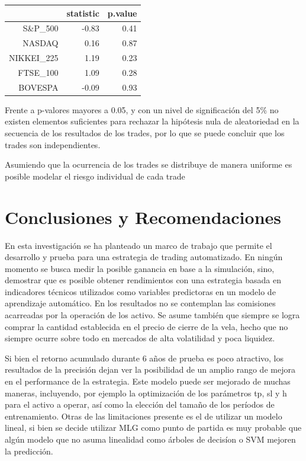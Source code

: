 \documentclass[a4paper,12pt]{Latex/Classes/PhDthesisPSnPDF}
\begin{document}
 
\begin{center}
\begin{table}[ht]
\centering
\begin{tabular}{rrr}
  \hline
 & statistic & p.value \\ 
  \hline
S\&P\_500 & -0.83 & 0.41 \\ 
  NASDAQ & 0.16 & 0.87 \\ 
  NIKKEI\_225 & 1.19 & 0.23 \\ 
  FTSE\_100 & 1.09 & 0.28 \\ 
  BOVESPA & -0.09 & 0.93 \\ 
   \hline
\end{tabular}
\end{table}\end{center}

Frente a p-valores mayores a 0.05, y con un nivel de significación del 5\% no existen elementos suficientes para rechazar la hipótesis nula de aleatoriedad en la secuencia de los resultados de los trades, por lo que se puede concluir que los trades son independientes.

Asumiendo que la ocurrencia de los trades se distribuye de manera uniforme es posible modelar el riesgo individual de cada trade
  

\chapter*{Conclusiones y Recomendaciones}

En esta investigación se ha planteado un marco de trabajo que permite el desarrollo y prueba para una estrategia de trading automatizado. En ningún momento se busca medir la posible ganancia en base a la simulación, sino, demostrar que es posible obtener rendimientos con una estrategia basada en indicadores técnicos utilizados como variables predictoras en un modelo de aprendizaje automático. En los resultados no se contemplan las comisiones acarreadas por la operación de los activo. Se asume también que siempre se logra comprar la cantidad establecida en el precio de cierre de la vela, hecho que no siempre ocurre sobre todo en mercados de alta volatilidad y poca liquidez.

Si bien el retorno acumulado durante 6 años de prueba es poco atractivo, los resultados de la precisión dejan ver la posibilidad de un amplio rango de mejora en el performance de la estrategia. Este modelo puede ser mejorado de muchas maneras, incluyendo, por ejemplo la optimización de los parámetros tp, sl y h para el activo a operar, así como la elección del tamaño de los períodos de entrenamiento. Otras de las limitaciones presente es el de utilizar un modelo lineal, si bien se decide utilizar MLG como punto de partida es muy probable que algún modelo que no asuma linealidad como árboles de decisíon o SVM mejoren la predicción. 
\end{document}
